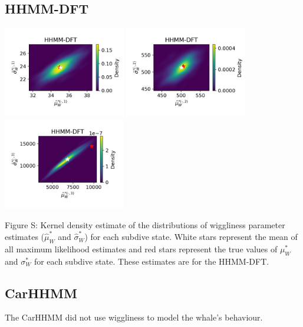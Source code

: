 \documentclass{article}
\begin{document}
        \subsection{HHMM-DFT}
        \begin{center}
        \includegraphics[width=2.1in]{../Plots/hhmm_FV_uncorr_MLE_density_FoVeDBA_0_0.png}
        \includegraphics[width=2.1in]{../Plots/hhmm_FV_uncorr_MLE_density_FoVeDBA_0_1.png}
        \includegraphics[width=2.1in]{../Plots/hhmm_FV_uncorr_MLE_density_FoVeDBA_0_2.png}
        \end{center}
        
        \noindent Figure S: Kernel density estimate of the distributions of wiggliness parameter estimates ($\hat \mu^*_W$ and $\hat \sigma^*_W$) for each subdive state. White stars represent the mean of all maximum likelihood estimates and red stars represent the true values of $\mu^*_W$ and $\sigma^*_W$ for each subdive state. These estimates are for the HHMM-DFT.
        \addtocounter{fignum}{1}
        
        \subsection{CarHHMM}
        The CarHHMM did not use wiggliness to model the whale's behaviour.
        
\end{document}
